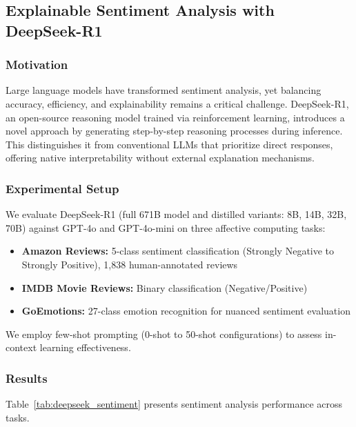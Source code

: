 \subsection{Explainable Sentiment Analysis with DeepSeek-R1}
\label{subsec:deepseek_sentiment}

\subsubsection{Motivation}

Large language models have transformed sentiment analysis, yet balancing accuracy, efficiency, and explainability remains a critical challenge. DeepSeek-R1, an open-source reasoning model trained via reinforcement learning, introduces a novel approach by generating step-by-step reasoning processes during inference. This distinguishes it from conventional LLMs that prioritize direct responses, offering native interpretability without external explanation mechanisms.

\subsubsection{Experimental Setup}

We evaluate DeepSeek-R1 (full 671B model and distilled variants: 8B, 14B, 32B, 70B) against GPT-4o and GPT-4o-mini on three affective computing tasks:

\begin{itemize}[leftmargin=*]
    \item \textbf{Amazon Reviews:} 5-class sentiment classification (Strongly Negative to Strongly Positive), 1,838 human-annotated reviews
    \item \textbf{IMDB Movie Reviews:} Binary classification (Negative/Positive)
    \item \textbf{GoEmotions:} 27-class emotion recognition for nuanced sentiment evaluation
\end{itemize}

We employ few-shot prompting (0-shot to 50-shot configurations) to assess in-context learning effectiveness.

\subsubsection{Results}

Table~\ref{tab:deepseek_sentiment} presents sentiment analysis performance across tasks.

